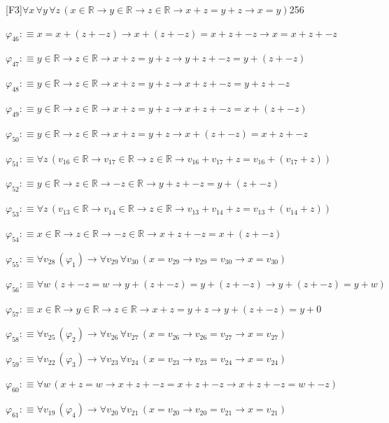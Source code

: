 \begin{fullproof}{[F3]}{$\forall x\,\forall y\,\forall z\,(x \in \mathbb{R} \to y \in \mathbb{R} \to z \in \mathbb{R} \to x + z = y + z \to x = y)$}{256}
\begin{abbrevlist}
\item $\varphi_{46} :\equiv x = x + (z + -z) \to x + (z + -z) = x + z + -z \to x = x + z + -z$
\item $\varphi_{47} :\equiv y \in \mathbb{R} \to z \in \mathbb{R} \to x + z = y + z \to y + z + -z = y + (z + -z)$
\item $\varphi_{48} :\equiv y \in \mathbb{R} \to z \in \mathbb{R} \to x + z = y + z \to x + z + -z = y + z + -z$
\item $\varphi_{49} :\equiv y \in \mathbb{R} \to z \in \mathbb{R} \to x + z = y + z \to x + z + -z = x + (z + -z)$
\item $\varphi_{50} :\equiv y \in \mathbb{R} \to z \in \mathbb{R} \to x + z = y + z \to x + (z + -z) = x + z + -z$
\item $\varphi_{51} :\equiv \forall z\,(v_{16} \in \mathbb{R} \to v_{17} \in \mathbb{R} \to z \in \mathbb{R} \to v_{16} + v_{17} + z = v_{16} + (v_{17} + z))$
\item $\varphi_{52} :\equiv y \in \mathbb{R} \to z \in \mathbb{R} \to -z \in \mathbb{R} \to y + z + -z = y + (z + -z)$
\item $\varphi_{53} :\equiv \forall z\,(v_{13} \in \mathbb{R} \to v_{14} \in \mathbb{R} \to z \in \mathbb{R} \to v_{13} + v_{14} + z = v_{13} + (v_{14} + z))$
\item $\varphi_{54} :\equiv x \in \mathbb{R} \to z \in \mathbb{R} \to -z \in \mathbb{R} \to x + z + -z = x + (z + -z)$
\item $\varphi_{55} :\equiv \forall v_{28}\,(\varphi_{1}) \to \forall v_{29}\,\forall v_{30}\,(x = v_{29} \to v_{29} = v_{30} \to x = v_{30})$
\item $\varphi_{56} :\equiv \forall w\,(z + -z = w \to y + (z + -z) = y + (z + -z) \to y + (z + -z) = y + w)$
\item $\varphi_{57} :\equiv x \in \mathbb{R} \to y \in \mathbb{R} \to z \in \mathbb{R} \to x + z = y + z \to y + (z + -z) = y + 0$
\item $\varphi_{58} :\equiv \forall v_{25}\,(\varphi_{2}) \to \forall v_{26}\,\forall v_{27}\,(x = v_{26} \to v_{26} = v_{27} \to x = v_{27})$
\item $\varphi_{59} :\equiv \forall v_{22}\,(\varphi_{3}) \to \forall v_{23}\,\forall v_{24}\,(x = v_{23} \to v_{23} = v_{24} \to x = v_{24})$
\item $\varphi_{60} :\equiv \forall w\,(x + z = w \to x + z + -z = x + z + -z \to x + z + -z = w + -z)$
\item $\varphi_{61} :\equiv \forall v_{19}\,(\varphi_{4}) \to \forall v_{20}\,\forall v_{21}\,(x = v_{20} \to v_{20} = v_{21} \to x = v_{21})$

\end{abbrevlist}
\end{fullproof}
